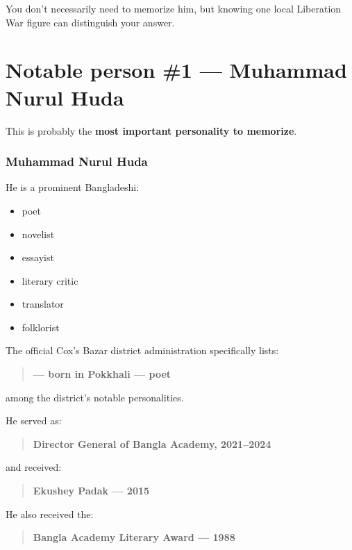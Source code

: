 You don't necessarily need to memorize him, but knowing one local Liberation War figure can distinguish your answer.

\medskip

\section{Notable person \#1 --- Muhammad Nurul Huda}

This is probably the \textbf{most important personality to memorize}.

\subsubsection{Muhammad Nurul Huda}

He is a prominent Bangladeshi:

\begin{itemize}
  \item poet
  \item novelist
  \item essayist
  \item literary critic
  \item translator
  \item folklorist
\end{itemize}

The official Cox's Bazar district administration specifically lists:

\begin{quote}
\textbf{    --- born in Pokkhali --- poet}\\
\end{quote}

among the district's notable personalities.

He served as:

\begin{quote}
\textbf{Director General of Bangla Academy, 2021--2024}\\
\end{quote}

and received:

\begin{quote}
\textbf{Ekushey Padak --- 2015}\\
\end{quote}

He also received the:

\begin{quote}
\textbf{Bangla Academy Literary Award --- 1988}\\
\end{quote}

